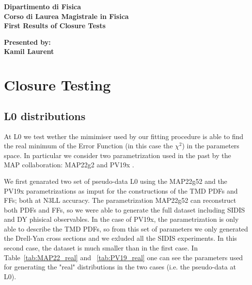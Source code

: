 \documentclass[12pt]{report}
\begin{document}
\begin{titlepage}

\begin{center}
	\textbf{ Dipartimento di Fisica\\ Corso di Laurea Magistrale in Fisica\\}
	\vspace{15mm}
    {\LARGE{\bf First Results of Closure Tests}}\\
	\vspace{3mm}
	\end{center}

\vspace{36mm}

\begin{minipage}[t]{0.47\textwidth}

	{\large{\bf Presented by: \\ Kamil Laurent\\ }}
\end{minipage}

\vspace{18mm}

\end{titlepage}

\tableofcontents

\chapter{Closure Testing}
\section{L0 distributions}
At L0 we test wether the mimimiser used by our fitting procedure is able to find the real minimum of the Error Function (in this case the $\chi^2$) in the parameters space. In particular we consider two parametrization used in the past by the MAP collaboration: MAP22g2 \cite{MAP22}  and PV19x \cite{MAP19}. 

We first genarated two set of pseudo-data L0 using the MAP22g52 and the PV19x parametrizations as imput for the constructions of the TMD PDFs and FFs; both at N3LL accuracy. The parametrization MAP22g52 can reconstruct both PDFs and FFs, so we were able to generate the full dataset including SIDIS and DY phisical observables. In the case of PV19x, the parametrization is only able to describe the TMD PDFs, so from this set of parameters we only generated the Drell-Yan cross sections and we exluded all the SIDIS experiments. In this second case, the dataset is much smaller than in the first case. In Table~\ref{tab:MAP22_real} and ~\ref{tab:PV19_real} one can see the parameters used for generating the "real" distributions in the two cases (i.e. the pseudo-data at L0). 
\end{document}
